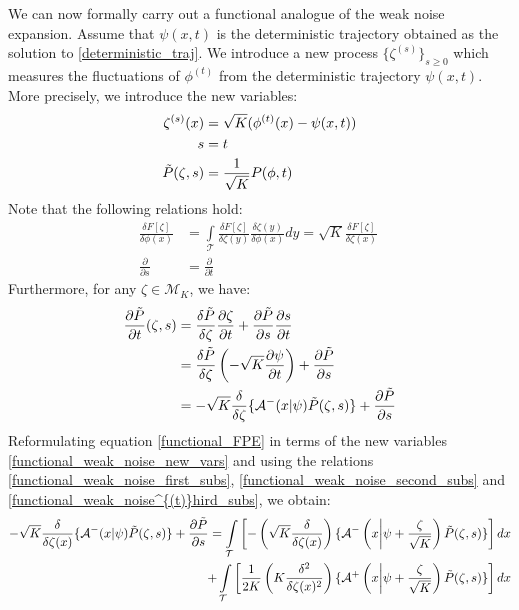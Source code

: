 We can now formally carry out a functional analogue of the weak noise expansion. Assume that $\psi(x,t)$ is the deterministic trajectory obtained as the solution to \eqref{deterministic_traj}. We introduce a new process $\{\zeta^{(s)}\}_{s \geq 0}$ which measures the fluctuations of $\phi^{(t)}$ from the deterministic trajectory $\psi(x,t)$. More precisely, we introduce the new variables:
\begin{equation}
\begin{aligned}
\label{functional_weak_noise_new_vars}
    \zeta^{(s)}(x) &= \sqrt{K}(\phi^{(t)}(x) - \psi(x,t))\\
    s &= t\\
    \Tilde{P}(\zeta,s) &= \frac{1}{\sqrt{K}}P(\phi,t)
\end{aligned}
\end{equation}
Note that the following relations hold:
\begin{align}
\frac{\delta F[\zeta]}{\delta \phi(x)} &= \int\limits_{\mathcal{T}}\frac{\delta F[\zeta]}{\delta \zeta(y)}\frac{\delta \zeta(y)}{\delta \phi(x)}dy = \sqrt{K}\frac{\delta F[\zeta]}{\delta \zeta(x)}\ \label{functional_weak_noise_first_subs}\\
\frac{\partial}{\partial s} &= \frac{\partial}{\partial t}\label{functional_weak_noise_second_subs}
\end{align}
Furthermore, for any $\zeta \in \mathcal{M}_K$, we have:
\begin{align}
\frac{\partial \Tilde{P}}{\partial t}(\zeta,s) &= \frac{\delta \Tilde{P}}{\delta \zeta}\frac{\partial \zeta}{\partial t} + \frac{\partial \Tilde{P}}{\partial s}\frac{\partial s}{\partial t}\nonumber\\
    &=\frac{\delta \Tilde{P}}{\delta \zeta}\left(-\sqrt{K}\frac{\partial \psi}{\partial t}\right) + \frac{\partial \Tilde{P}}{\partial s}\nonumber\\
    &= -\sqrt{K}\frac{\delta}{\delta \zeta}\{\mathcal{A}^{-}(x|\psi)\Tilde{P}(\zeta,s)\} + \frac{\partial \Tilde{P}}{\partial s}\label{functional_weak_noise^{(t)}hird_subs}
\end{align}
Reformulating equation \eqref{functional_FPE} in terms of the new variables \eqref{functional_weak_noise_new_vars} and using the relations \eqref{functional_weak_noise_first_subs}, \eqref{functional_weak_noise_second_subs} and \eqref{functional_weak_noise^{(t)}hird_subs}, we obtain:
\begin{equation*}
\begin{split}
-\sqrt{K}\frac{\delta}{\delta \zeta(x)}\{\mathcal{A}^{-}(x|\psi)\Tilde{P}(\zeta,s)\} + \frac{\partial \Tilde{P}}{\partial s} = \int\limits_{\mathcal{T}}\left[-
    \left(\sqrt{K}\frac{\delta }{\delta \zeta(x)}\right)\{\mathcal{A}^{-}\left(x\bigg{|}\psi+\frac{\zeta}{\sqrt{K}}\right)\tilde{P}(\zeta,s)\}\right]dx \\
    + \int\limits_{\mathcal{T}}\left[\frac{1}{2K}\left(K\frac{\delta^2}{\delta\zeta(x)^2}\right)\{\mathcal{A}^{+}\left(x\bigg{|}\psi+\frac{\zeta}{\sqrt{K}}\right)\Tilde{P}(\zeta,s)\}\right]dx    
\end{split}
\end{equation*}
